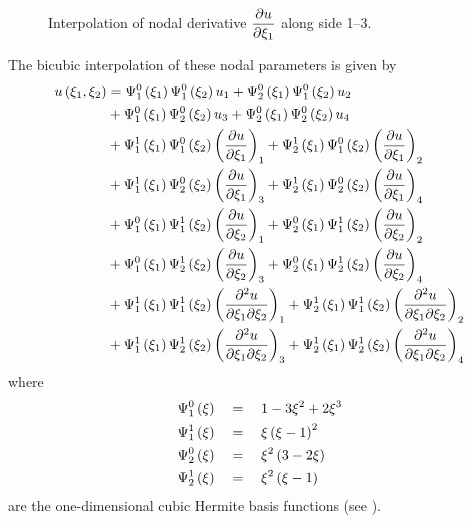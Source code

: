 \begin{figure}[htbp] \centering
  
  \caption{Interpolation of nodal derivative $ \dfrac{\partial u}{\partial \xi_{1}} $ along side 
    1--3.}
  \label{fig:interpol}
\end{figure}
The bicubic interpolation of these nodal parameters is given by
\begin{gather}
  \begin{aligned}
    \fnof{u}{\xione,\xitwo} &= \chbfn{1}{0}{\xione}\chbfn{1}{0}{\xitwo}u_{1} +
    \chbfn{2}{0}{\xione}\chbfn{1}{0}{\xitwo}u_{2} \\ 
    &+ \chbfn{1}{0}{\xione}\chbfn{2}{0}{\xitwo}u_{3} +
    \chbfn{2}{0}{\xione}\chbfn{2}{0}{\xitwo}u_{4} \\ &+
    \chbfn{1}{1}{\xione}\chbfn{1}{0}{\xitwo}\pbrac{\delby{u}{\xione}}_{1} +
    \chbfn{2}{1}{\xione}\chbfn{1}{0}{\xitwo}\pbrac{\delby{u}{\xione}}_{2} \\ &+
    \chbfn{1}{1}{\xione}\chbfn{2}{0}{\xitwo}\pbrac{\delby{u}{\xione}}_{3} +
    \chbfn{2}{1}{\xione}\chbfn{2}{0}{\xitwo}\pbrac{\delby{u}{\xione}}_{4} \\ &+
    \chbfn{1}{0}{\xione}\chbfn{1}{1}{\xitwo}\pbrac{\delby{u}{\xitwo}}_{1} +
    \chbfn{2}{0}{\xione}\chbfn{1}{1}{\xitwo}\pbrac{\delby{u}{\xitwo}}_{2} \\ &+
    \chbfn{1}{0}{\xione}\chbfn{2}{1}{\xitwo}\pbrac{\delby{u}{\xitwo}}_{3} +
    \chbfn{2}{0}{\xione}\chbfn{2}{1}{\xitwo}\pbrac{\delby{u}{\xitwo}}_{4} \\ &+
    \chbfn{1}{1}{\xione}\chbfn{1}{1}{\xitwo}
    \pbrac{\deltwoby{u}{\xione}{\xitwo}}_{1} +
    \chbfn{2}{1}{\xione}\chbfn{1}{1}{\xitwo}
    \pbrac{\deltwoby{u}{\xione}{\xitwo}}_{2} \\ &+ 
    \chbfn{1}{1}{\xione}\chbfn{2}{1}{\xitwo}
    \pbrac{\deltwoby{u}{\xione}{\xitwo}}_{3} +
    \chbfn{2}{1}{\xione}\chbfn{2}{1}{\xitwo}
    \pbrac{\deltwoby{u}{\xione}{\xitwo}}_{4}  
  \end{aligned}
  \label{eqn:bicubic}
\end{gather}
where
\begin{gather}
  \begin{aligned}
       \Psi_{1}^{0} \left( \xi \right)   \quad &= \quad 1-3\xi^2+2\xi^3 \\ 
       \Psi_{1}^{1} \left( \xi \right)   \quad &= \quad \xi\left( \xi -1 \right)^2 \\
       \Psi_{2}^{0} \left( \xi \right)   \quad &= \quad \xi^2\left( 3-2\xi \right) \\
       \Psi_{2}^{1} \left( \xi \right)   \quad &= \quad \xi^2\left( \xi -1 \right)
  \end{aligned}
\end{gather}
are the one-dimensional cubic Hermite basis functions (see ).


